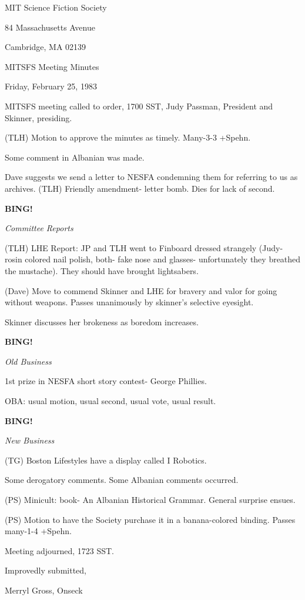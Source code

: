 \documentclass[12pt]{article}
\newcommand{\bing}{{\bf BING!} }
\newcommand{\goto}[1]{\bing \vskip 12pt \centerline{{\em{#1}}}}
\begin{document}
\begin{center}

MIT Science Fiction Society 

84 Massachusetts Avenue

Cambridge, MA 02139

\vspace{12pt}

MITSFS Meeting Minutes 

Friday, February 25, 1983

\end{center}
 
\vspace{18pt}

\setlength{\parskip}{6pt}

\noindent
MITSFS meeting called to order, 1700 SST,
Judy Passman, President and Skinner, presiding.

(TLH) Motion to approve the minutes as timely. Many-3-3 +Spehn.

Some comment in Albanian was made.

Dave suggests we send a letter to NESFA condemning them for referring to us as archives. (TLH) Friendly amendment- letter bomb. Dies for lack of second.

\goto{Committee Reports}

(TLH) LHE Report: JP and TLH went to Finboard dressed strangely (Judy- rosin colored nail polish, both- fake nose and glasses- unfortunately they breathed the mustache). They should have brought lightsabers.

(Dave) Move to commend Skinner and LHE for bravery and valor for going without weapons. Passes unanimously by skinner's selective eyesight.

Skinner discusses her brokeness as boredom increases.

\goto{Old Business}

1st prize in NESFA short story contest- George Phillies.

OBA: usual motion, usual second, usual vote, usual result.

\goto{New Business}

(TG) Boston Lifestyles have a display called I Robotics.

Some derogatory comments. Some Albanian comments occurred.

(PS) Minicult: book- An Albanian Historical Grammar. General surprise ensues.

(PS) Motion to have the Society purchase it in a banana-colored binding. Passes many-1-4 +Spehn.

\vspace{12pt}

\noindent
Meeting adjourned, 1723 SST.

\vspace{18pt}

\centerline{Improvedly submitted,}
\centerline{Merryl Gross, Onseck}
\end{document}
